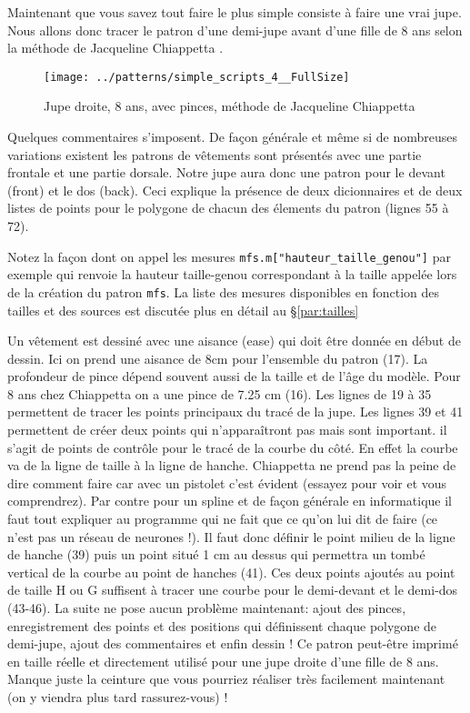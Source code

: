 \documentclass[10pt,a4paper,twoside]{report}
\begin{document}
Maintenant que vous savez tout faire le plus simple consiste à faire une vrai jupe. Nous allons donc tracer le patron d'une demi-jupe avant d'une fille de 8 ans selon la méthode de Jacqueline Chiappetta \cite{Chiappetta1999}.




\begin{figure}[tb]
\begin{center}
\texttt{[image: ../patterns/simple\_scripts\_4\_\_FullSize]}
\end{center}
\caption{Jupe droite, 8 ans, avec pinces, méthode de Jacqueline Chiappetta}
\label{fig:trapeze}
\end{figure}

Quelques commentaires s'imposent. De façon générale et même si de nombreuses variations existent les patrons de vêtements sont présentés avec une partie frontale et une partie dorsale. Notre jupe aura donc une patron pour le devant (front) et le dos (back). Ceci explique la présence de deux dicionnaires et de deux listes de points pour le polygone de chacun des élements du patron (lignes 55 à 72).

Notez la façon dont on appel les mesures \texttt{mfs.m["hauteur\_taille\_genou"]} par exemple qui renvoie la hauteur taille-genou correspondant à la taille appelée lors de la création du patron \texttt{mfs}. La liste des mesures disponibles en fonction des tailles et des sources est discutée plus en détail au \S\ref{par:tailles}

Un vêtement est dessiné avec une aisance (ease) qui doit être donnée en début de dessin. Ici on prend une aisance de 8cm pour l'ensemble du patron (17). La profondeur de pince dépend souvent aussi de la taille et de l'âge du modèle. Pour 8 ans chez Chiappetta \cite{Chiappetta1999} on a une pince de 7.25 cm (16). Les lignes de 19 à 35 permettent de tracer les points principaux du tracé de la jupe. Les lignes 39 et 41 permettent de créer deux points qui n'apparaîtront pas mais sont important. il s'agit de points de contrôle pour le tracé de la courbe du côté. En effet la courbe va de la ligne de taille à la ligne de hanche. Chiappetta ne  prend pas la peine de dire comment faire car avec un pistolet c'est évident (essayez pour voir et vous comprendrez). Par contre pour un spline et de façon générale en informatique il faut tout expliquer au programme qui ne fait que ce qu'on lui dit de faire (ce n'est pas un réseau de neurones !). Il faut donc définir le point milieu de la ligne de hanche (39) puis un point situé 1 cm au dessus qui permettra un tombé vertical de la courbe au point de hanches (41). Ces deux points ajoutés au point de taille H ou G suffisent à tracer une courbe pour le demi-devant et le demi-dos (43-46). La suite ne pose aucun problème maintenant: ajout des pinces, enregistrement des points et des positions qui définissent chaque polygone de demi-jupe, ajout des commentaires  et enfin dessin ! Ce patron peut-être imprimé en taille réelle et directement utilisé pour une jupe droite d'une fille de 8 ans. Manque juste la ceinture  que vous pourriez réaliser très facilement maintenant (on y viendra plus tard rassurez-vous) !
\end{document}

